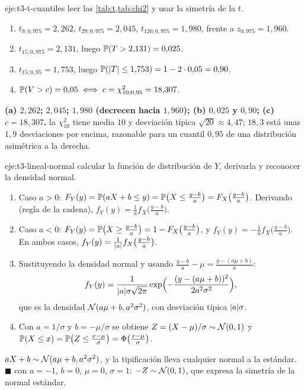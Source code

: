 \begin{solucion}{eje:t3-t-cuantiles}
\planteamiento leer las \cref{tab:t,tab:chi2} y usar la simetría de la $t$.
\pasos
\begin{enumerate}[label=\arabic*.]
  \item $t_{9;0{,}975}=2{,}262$, $t_{29;0{,}975}=2{,}045$, $t_{120;0{,}975}=1{,}980$, frente a $z_{0{,}975}=1{,}960$.
  \item $t_{15;0{,}975}=2{,}131$, luego $\mathbb{P}(T>2{,}131)=0{,}025$.
  \item $t_{15;0{,}95}=1{,}753$, luego $\mathbb{P}(\lvert T\rvert\le1{,}753)=1-2\cdot0{,}05=0{,}90$.
  \item $\mathbb{P}(V>c)=0{,}05\iff c=\chi^{2}_{10;0{,}95}=18{,}307$.
\end{enumerate}
\resultado \textbf{(a) $2{,}262$; $2{,}045$; $1{,}980$ (decrecen hacia $1{,}960$); (b) $0{,}025$ y $0{,}90$; (c) $c=18{,}307$.}
\comprobacion la $\chi^{2}_{10}$ tiene media $10$ y desviación típica $\sqrt{20}\approx4{,}47$; $18{,}3$ está unas $1{,}9$ desviaciones por encima, razonable para un cuantil $0{,}95$ de una distribución asimétrica a la derecha.
\end{solucion}

\begin{solucion}{eje:t3-lineal-normal}
\planteamiento calcular la función de distribución de $Y$, derivarla y reconocer la densidad normal.
\pasos
\begin{enumerate}[label=\arabic*.]
  \item Caso $a>0$: $F_Y(y)=\mathbb{P}(aX+b\le y)=\mathbb{P}\bigl(X\le\frac{y-b}{a}\bigr)=F_X\bigl(\frac{y-b}{a}\bigr)$. Derivando (regla de la cadena), $f_Y(y)=\frac1af_X\bigl(\frac{y-b}{a}\bigr)$.
  \item Caso $a<0$: $F_Y(y)=\mathbb{P}\bigl(X\ge\frac{y-b}{a}\bigr)=1-F_X\bigl(\frac{y-b}{a}\bigr)$, y $f_Y(y)=-\frac1af_X\bigl(\frac{y-b}{a}\bigr)$. En ambos casos, $f_Y(y)=\frac{1}{\lvert a\rvert}f_X\bigl(\frac{y-b}{a}\bigr)$.
  \item Sustituyendo la densidad normal y usando $\frac{y-b}{a}-\mu=\frac{y-(a\mu+b)}{a}$:
  \[
  f_Y(y)=\frac{1}{\lvert a\rvert\sigma\sqrt{2\pi}}\exp\Bigl(-\frac{(y-(a\mu+b))^{2}}{2a^{2}\sigma^{2}}\Bigr),
  \]
  que es la densidad $\mathcal{N}(a\mu+b,a^{2}\sigma^{2})$, con desviación típica $\lvert a\rvert\sigma$.
  \item Con $a=1/\sigma$ y $b=-\mu/\sigma$ se obtiene $Z=(X-\mu)/\sigma\sim\mathcal{N}(0,1)$ y $\mathbb{P}(X\le x)=\mathbb{P}\bigl(Z\le\frac{x-\mu}{\sigma}\bigr)=\Phi\bigl(\frac{x-\mu}{\sigma}\bigr)$.
\end{enumerate}
\resultado \textbf{$aX+b\sim\mathcal{N}(a\mu+b,a^{2}\sigma^{2})$}, y la tipificación lleva cualquier normal a la estándar. $\blacksquare$
\comprobacion con $a=-1$, $b=0$, $\mu=0$, $\sigma=1$: $-Z\sim\mathcal{N}(0,1)$, que expresa la simetría de la normal estándar.
\end{solucion}


